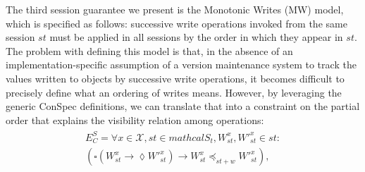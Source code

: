 \documentclass[conference]{IEEEtran}
\begin{document}
	The third session guarantee we present is the Monotonic Writes (MW) model, which is specified as follows: successive write operations invoked from the same session $st$ must be applied in all sessions by the order in which they appear in $st$. The problem with defining this model is that, in the absence of an implementation-specific assumption of a version maintenance system to track the values written to objects by successive write operations, it becomes difficult to precisely define what an ordering of writes means. However, by leveraging the generic ConSpec definitions, we can translate that into a constraint on the partial order that explains the visibility relation among operations:
	\begin{align}\label{eqn:MW}
	\begin{split}
	E^S_C =   \forall x \in \mathcal{X}, \mathit{st} \in mathcal{S}_t, W_\mathit{st}^x, W'^x_\mathit{st} \in \mathit{st}: \\ \left( \square \left( W_\mathit{st}^x \rightarrow \lozenge W'^{x}_\mathit{st} \right)
	\rightarrow W_\mathit{st}^x \preccurlyeq_{\mathit{st}+w} W'^{x}_\mathit{st} \right),

\end{split}
\end{align}
\end{document}
